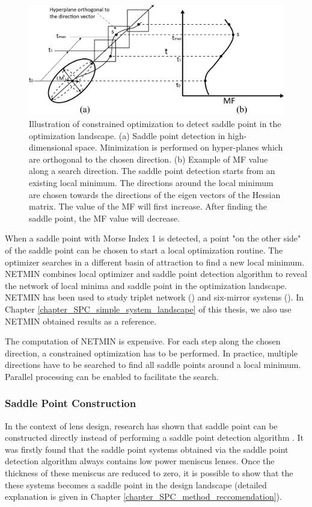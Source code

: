 \begin{figure}
    \centering
    \includegraphics[scale=0.58]{chapter-1/figures/spd_plot.png}
    \caption{Illustration of constrained optimization to detect saddle point in the optimization landscape. (a) Saddle point detection in high-dimensional space. Minimization is performed on hyper-planes which are orthogonal to the chosen direction. (b) Example of MF value along a search direction. The saddle point detection starts from an existing local minimum. The directions around the local minimum are chosen towards the directions of the eigen vectors of the Hessian matrix. The value of the MF will first increase. After finding the saddle point, the MF value will decrease. }
    \label{fig: spd_illustration}
\end{figure} 

When a saddle point with Morse Index 1 is detected, a point "on the other side" of the saddle point can be chosen to start a local optimization routine. The optimizer searches in a different basin of attraction to find a new local minimum. NETMIN combines local optimizer and saddle point detection algorithm to reveal the network of local minima and saddle point in the optimization landscape. NETMIN has been used to study triplet network (\cite{PascalTriplet2009}) and six-mirror systems (\cite{MarinescuSPD07}). In Chapter \ref{chapter_SPC_simple_system_landscape} of this thesis, we also use NETMIN obtained results as a reference. 

The computation of NETMIN is expensive. For each step along the chosen direction, a constrained optimization has to be performed. In practice, multiple directions have to be searched to find all saddle points around a local minimum. Parallel processing can be enabled to facilitate the search.  


\subsubsection{Saddle Point Construction }
In the context of lens design, research has shown that saddle point can be constructed directly instead of performing a saddle point detection algorithm \cite{vanTurnhoutThesis2009} \cite{MVTurnhoutSPC15}. It was firstly found that the saddle point systems obtained via the saddle point detection algorithm always contains low power meniscus lenses. Once the thickness of these meniscus are reduced to zero, it is possible to show that the these systems becomes a saddle point in the design landscape (detailed explanation is given in Chapter \ref{chapter_SPC_method_reccomendation}).

